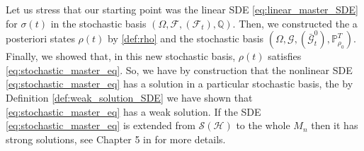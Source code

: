 Let us stress that our starting point was the linear SDE \eqref{eq:linear_master_SDE} for $\sigma(t)$ in the stochastic basis $\left(\Omega, \mathcal{F},\left(\mathcal{F}_{t}\right), \mathbb{Q}\right) .$ Then, we constructed the a posteriori states $\rho(t)$ by \eqref{def:rho} and the stochastic basis $\left(\Omega, \mathcal{G},\left(\bar{\mathcal{G}}_{t}^{0}\right), \mathbb{P}_{\rho_{0}}^{T}\right) .$ Finally, we showed that, in this new stochastic basis, $\rho(t)$ satisfies \eqref{eq:stochastic_master_eq}. So, we have by construction that the nonlinear SDE  \eqref{eq:stochastic_master_eq} has a solution in a particular stochastic basis, the by Definition \ref{def:weak_solution_SDE}
we have shown that \eqref{eq:stochastic_master_eq} has a weak solution. If the SDE \eqref{eq:stochastic_master_eq} is  extended from $ \mathcal{S}(\mathcal{H}) $ to the whole $ M_n $ then it has strong
solutions, see Chapter 5 in \cite{alberto2009quantum} for more details.